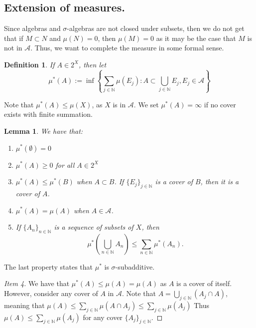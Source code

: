 \documentclass{article}
\newtheorem{lemma}[theorem]{Lemma}
\newtheorem{definition}[theorem]{Definition}
\theoremstyle{definition}
\numberwithin{theorem}{section}
\numberwithin{equation}{section}
\newcommand{\alg}{\mathcal{A}}
\begin{document}
\subsection{Extension of measures.}
Since algebras and $\sigma$-algebras are not closed under subsets, then we do not get that if $M \subset N$ and $\mu(N) = 0$, then $\mu(M) = 0$ as it may be the case that $M$ is not in $\alg$. Thus, we want to complete the measure in some formal sense.

\begin{definition}
	If $A \in 2^X$, then let
	\begin{equation}
		\mu^*(A) := \inf \left\lbrace \sum_{j \in \mathbb{N}} \mu(E_j) : A \subset \bigcup_{j \in \mathbb{N}} E_j, E_j \in \alg \right\rbrace
	\end{equation}
\end{definition} 
Note that $\mu^*(A) \leq \mu(X)$, as $X$ is in $\alg$. We set $\mu^*(A) = \infty$ if no cover exists with finite summation.

\begin{lemma}
	We have that:
	\begin{enumerate}
		\item $\mu^*(\emptyset) = 0$
		\item $\mu^*(A) \geq 0$ for all $A \in 2^X$
		\item $\mu^*(A) \leq \mu^*(B)$ when $A \subset B$. If $\lbrace E_j \rbrace_{j \in \mathbb{N}}$ is a cover of $B$, then it is a cover of $A$.
		\item $\mu^*(A) = \mu(A)$ when $A \in \alg$. 
		\item If $\lbrace A_n \rbrace_{n \in \mathbb{N}}$ is a sequence of subsets of $X$, then
		\begin{equation}
			\mu^*\left(\bigcup_{n \in \mathbb{N}} A_n \right) \leq \sum_{n \in \mathbb{N}} \mu^*(A_n).
		\end{equation}
	\end{enumerate}
\end{lemma}
The last property states that $\mu^*$ is $\sigma$-subadditive.

\begin{proof}[Item 4]
	We have that $\mu^*(A) \leq \mu(A)= \mu(A)$ as $A$ is a cover of itself. However, consider any cover of $A$ in $\alg$. Note that $A = \bigcup_{j \in \mathbb{N}}(A_j \cap A)$, meaning that $\mu(A) \leq \sum_{j \in \mathbb{N}} \mu(A \cap A_j) \leq \sum_{j \in \mathbb{N}} \mu(A_j)$
	Thus $\mu(A) \leq \sum_{j \in \mathbb{N}} \mu(A_j)$ for any cover $\lbrace A_j \rbrace_{j \in \mathbb{N}}$. 
\end{proof}
\end{document}

